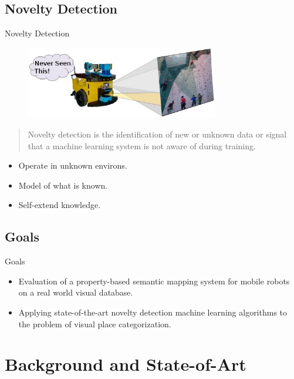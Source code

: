 \documentclass[compress]{beamer}
\begin{document}
\subsection{Novelty Detection}
\begin{frame}{Novelty Detection}
\begin{figure}
\includegraphics[width=0.75\textwidth]{novelty_detection}
\end{figure}

\begin{quotation}
Novelty detection is the identification of new or unknown data or signal that a machine learning system is not aware of during training\cite{markou2003novelty}.
\end{quotation}
\begin{itemize}
\item Operate in unknown environs.
\item Model of what is known.
\item Self-extend knowledge.
\end{itemize}
\end{frame}

\subsection{Goals}
\begin{frame}{Goals}


\begin{itemize}
\item Evaluation of a property-based semantic mapping system for mobile robots on a real world visual database\cite{pronobis2011exploiting}.
\vfill
\item Applying state-of-the-art novelty detection machine learning algorithms to the problem of visual place categorization.
\end{itemize}
\end{frame}



\section{Background and State-of-Art}
\end{document}
